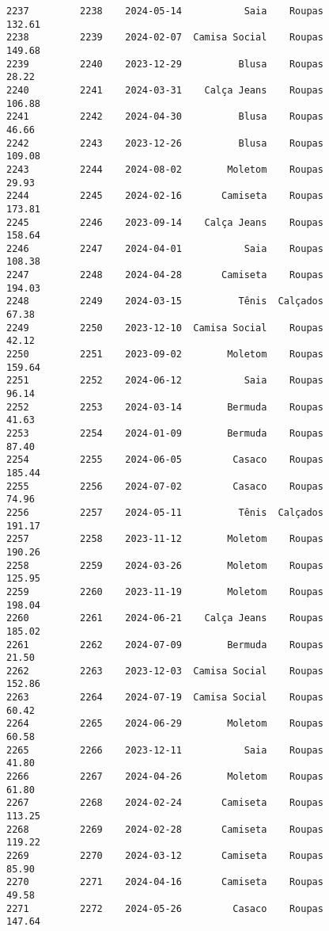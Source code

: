 \documentclass[11pt]{article}
\begin{document}
\begin{Verbatim}[commandchars=\\\{\}]
2237         2238    2024-05-14           Saia    Roupas          132.61   
2238         2239    2024-02-07  Camisa Social    Roupas          149.68   
2239         2240    2023-12-29          Blusa    Roupas           28.22   
2240         2241    2024-03-31    Calça Jeans    Roupas          106.88   
2241         2242    2024-04-30          Blusa    Roupas           46.66   
2242         2243    2023-12-26          Blusa    Roupas          109.08   
2243         2244    2024-08-02        Moletom    Roupas           29.93   
2244         2245    2024-02-16       Camiseta    Roupas          173.81   
2245         2246    2023-09-14    Calça Jeans    Roupas          158.64   
2246         2247    2024-04-01           Saia    Roupas          108.38   
2247         2248    2024-04-28       Camiseta    Roupas          194.03   
2248         2249    2024-03-15          Tênis  Calçados           67.38   
2249         2250    2023-12-10  Camisa Social    Roupas           42.12   
2250         2251    2023-09-02        Moletom    Roupas          159.64   
2251         2252    2024-06-12           Saia    Roupas           96.14   
2252         2253    2024-03-14        Bermuda    Roupas           41.63   
2253         2254    2024-01-09        Bermuda    Roupas           87.40   
2254         2255    2024-06-05         Casaco    Roupas          185.44   
2255         2256    2024-07-02         Casaco    Roupas           74.96   
2256         2257    2024-05-11          Tênis  Calçados          191.17   
2257         2258    2023-11-12        Moletom    Roupas          190.26   
2258         2259    2024-03-26        Moletom    Roupas          125.95   
2259         2260    2023-11-19        Moletom    Roupas          198.04   
2260         2261    2024-06-21    Calça Jeans    Roupas          185.02   
2261         2262    2024-07-09        Bermuda    Roupas           21.50   
2262         2263    2023-12-03  Camisa Social    Roupas          152.86   
2263         2264    2024-07-19  Camisa Social    Roupas           60.42   
2264         2265    2024-06-29        Moletom    Roupas           60.58   
2265         2266    2023-12-11           Saia    Roupas           41.80   
2266         2267    2024-04-26        Moletom    Roupas           61.80   
2267         2268    2024-02-24       Camiseta    Roupas          113.25   
2268         2269    2024-02-28       Camiseta    Roupas          119.22   
2269         2270    2024-03-12       Camiseta    Roupas           85.90   
2270         2271    2024-04-16       Camiseta    Roupas           49.58   
2271         2272    2024-05-26         Casaco    Roupas          147.64   

\end{Verbatim}
\end{document}
